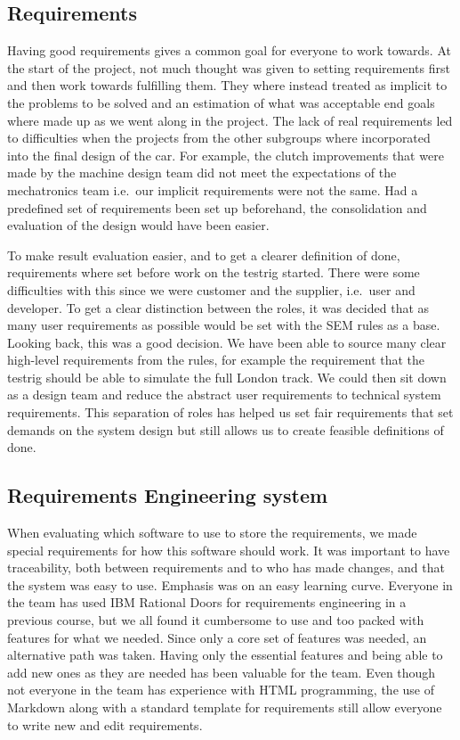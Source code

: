 \subsection{Requirements}
Having good requirements gives a common goal for everyone to work towards. At
the start of the project, not much thought was given to setting requirements
first and then work towards fulfilling them. They where instead treated as
implicit to the problems to be solved and an estimation of what was acceptable
end goals where made up as we went along in the project. The lack of real
requirements led to difficulties when the projects from the other subgroups
where incorporated into the final design of the car. For example, the clutch
improvements that were made by the machine design team did not meet the
expectations of the mechatronics team i.e.\ our implicit requirements were not
the same. Had a predefined set of requirements been set up beforehand, the
consolidation and evaluation of the design would have been easier.

To make result evaluation easier, and to get a clearer definition of done,
requirements where set before work on the testrig started. There were some
difficulties with this since we were customer and the supplier, i.e.\ user and
developer. To get a clear distinction between the roles, it was decided that as
many user requirements as possible would be set with the SEM rules as a base.
Looking back, this was a good decision. We have been able to source many clear
high-level requirements from the rules, for example the requirement that the
testrig should be able to simulate the full London track. We could then sit down
as a design team and reduce the abstract user requirements to technical system
requirements. This separation of roles has helped us set fair requirements that
set demands on the system design but still allows us to create feasible
definitions of done. 

\subsection{Requirements Engineering system}
When evaluating which software to use to store the requirements, we made
special requirements for how this software should work. It was important to have
traceability, both between requirements and to who has made changes, and that
the system was easy to use. Emphasis was on an easy learning curve. Everyone in
the team has used IBM Rational Doors for requirements engineering in a previous
course, but we all found it cumbersome to use and too packed with features for
what we needed. Since only a core set of features was needed, an alternative
path was taken. Having only the essential features and being able to add new
ones as they are needed has been valuable for the team. Even though not everyone
in the team has experience with HTML programming, the use of Markdown along with
a standard template for requirements still allow everyone to write new and edit
requirements. 

